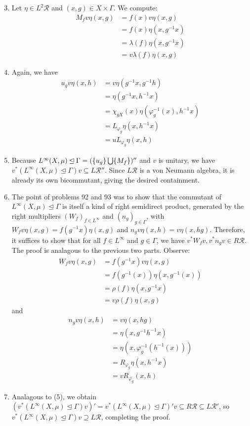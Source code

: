 \documentclass[a4paper,10pt]{report}
\DeclarePairedDelimiter{\set}{\{}{\}}
\begin{document}
\begin{enumerate}
\begin{enumerate}
				\setcounter{enumi}{2}
			\item Let $\eta\in L^2\mathcal{R}$ and $(x,g)\in X\times\Gamma$. We compute:
				\begin{align*}
					M_fv\eta(x,g) &= f(x)v\eta(x,g)\\
					&= f(x)\eta(x,g^{-1}x)\\
					&= \lambda(f)\eta(x,g^{-1}x)\\
					&= v\lambda(f)\eta(x,g)
				\end{align*}
			\item Again, we have 
				\begin{align*}
					u_gv\eta(x,h) &= v\eta(g^{-1}x,g^{-1}h)\\
					&= \eta(g^{-1}x,h^{-1}x)\\
					&= \chi_{gX}(x)\eta(\varphi_g^{-1}(x),h^{-1}x)\\
					&= L_{\varphi_g}\eta(x,h^{-1}x)\\
					&= uL_{\varphi_g}\eta(x,h)
				\end{align*}
			\item %
				Because $L^\infty(X,\mu)\unlhd\Gamma=(\set{u_g}\bigcup\set{M_f})''$ and $v$ is unitary, we have $v^*(L^\infty(X,\mu)\unlhd\Gamma)v\subseteq L\mathcal{R}''$. Since $L\mathcal{R}$ is a von Neumann algebra, it is already its own bicommutant, giving the desired containment. 
			\item The point of problems 92 and 93 was to show that the commutant of $L^\infty(X,\mu)\unlhd\Gamma$ is itself a kind of right semidirect product, generated by the right multipliers $(W_f)_{f\in L^\infty}$ and $(n_g)_{g\in\Gamma}$, with $W_fv\eta(x,g)=f(g^{-1}x)\eta(x,g)$ and $n_gv\eta(x,h)=v\eta(x,hg)$. %
				Therefore, it suffices to show that for all $f\in L^\infty$ and $g\in\Gamma$, we have $v^*W_fv,v^*n_gv\in R\mathcal{R}$. The proof is analagous to the previous two parts. Observe: 
				\begin{align*}
					W_fv\eta(x,g) &= f(g^{-1}x)v\eta(x,g)\\
					&= f(g^{-1}(x))\eta(x,g^{-1}(x))\\
					&= \rho(f)\eta(x,g^{-1}x)\\
					&= v\rho(f)\eta(x,g)
				\end{align*}
				and 
				\begin{align*}
					n_gv\eta(x,h) &= v\eta(x,hg)\\
					&= \eta(x,g^{-1}h^{-1}x)\\
					&= \eta(x,\varphi_g^{-1}(h^{-1}(x)))\\
					&= R_{\varphi_g}\eta(x,h^{-1}x)\\
					&= vR_{\varphi_g}(x,h)
				\end{align*}
			\item Analagous to (5), we obtain $(v^*(L^\infty(X,\mu)\unlhd\Gamma)v)'=v^*(L^\infty(X,\mu)\unlhd\Gamma)'v\subseteq R\mathcal{R}\subseteq L\mathcal{R}'$, so $v^*(L^\infty(X,\mu)\unlhd\Gamma)v\supseteq L\mathcal{R}$, completing the proof. 
		\end{enumerate}






\end{enumerate}
\end{document}
